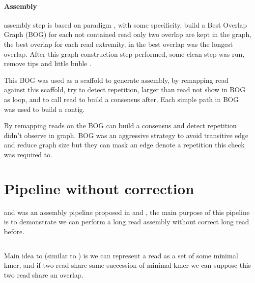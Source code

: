 \documentclass[main]{subfiles}
\begin{document}
\paragraph{Assembly}

\canu assembly step is based on \OLC paradigm , with some specificity. \canu build a Best Overlap Graph (BOG) for each not contained read only two overlap are kept in the graph, the best overlap for each read extremity, in \canu the best overlap was the longest overlap. After this graph construction step performed, some clean step was run, remove tips and little buble .

This BOG was used as a scaffold to generate assembly, by remapping read against this scaffold, \canu try to detect repetition, larger than read not show in BOG as loop, and to call read to build a consensus after. Each simple path in BOG was used to build a contig. 

By remapping reads on the BOG \canu can build a consensus and detect repetition didn't observe in graph. BOG was an aggressive strategy to avoid transitive edge and reduce graph size but they can mask an edge denote a repetition this check was required to. 


\section{Pipeline without correction \miniasm} \label{section:sota:miniasm}

\minimap and \miniasm was an assembly pipeline proposed in \cite{miniasm_minimap} and \cite{minimap2}, the main purpose of this pipeline is to demonstrate we can perform a long read assembly without correct long read before.


\subsection{\minimap}

Main idea to \minimap (similar to \mhap) is we can represent a read as a set of some minimal kmer, and if two read share same succession of minimal kmer we can suppose this two read share an overlap.
\end{document}
